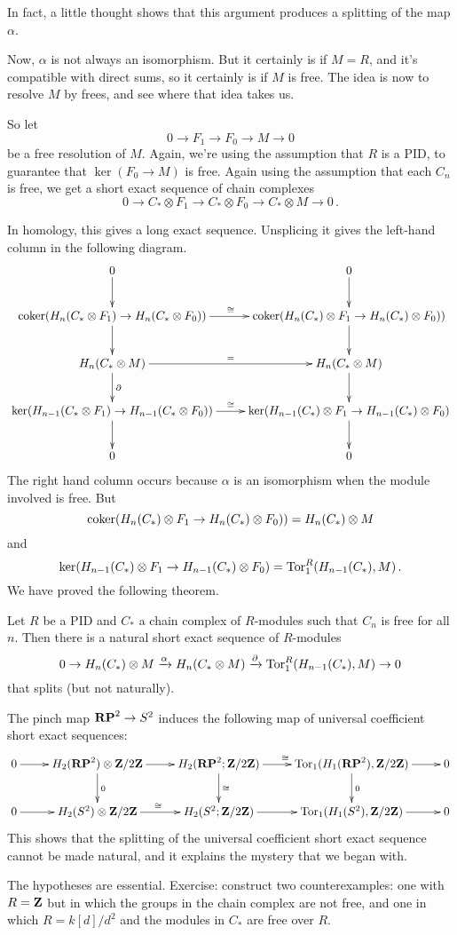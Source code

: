 In fact, a little thought shows that this argument produces a splitting of
the map $\alpha$. 

Now, $\alpha$ is not always an isomorphism. But it certainly is if $M=R$, 
and it's compatible with direct sums, so it certainly is if $M$ is free. 
The idea is now to resolve $M$ by frees, and see where that idea takes us.

So let 
\[
0\to F_1\to F_0\to M\to0
\]
be a free resolution of $M$. Again, we're using the assumption that $R$ is
a PID, to guarantee that $\ker(F_0\to M)$ is free. Again using the assumption
that each $C_n$ is free, we get a short exact sequence of chain complexes
\[
0\to C_*\otimes F_1\to C_*\otimes F_0\to C_*\otimes M\to0\,.
\]

In homology, this gives a long exact sequence. Unsplicing it gives the
left-hand column in the following diagram.
\begin{equation*}
\xymatrix{
0 \ar[d] & 0\ar[d] \\
\coker(H_n(C_\ast\otimes F_1)\to H_n(C_\ast\otimes F_0)) \ar[d] \ar[r]^\cong 
& \coker(H_n(C_\ast)\otimes F_1\to H_n(C_\ast)\otimes F_0)) \ar[d] \\
H_n(C_\ast\otimes M) \ar[d]^\partial \ar[r]^= & 
H_n(C_\ast\otimes M) \ar[d]\\
\ker( H_{n-1}(C_\ast\otimes F_1)\to H_{n-1}(C_\ast\otimes F_0))
\ar[r]^\cong\ar[d] & 
\ker(H_{n-1}(C_*)\otimes F_1\to H_{n-1}(C_*)\otimes F_0) \ar[d]\\
0 & 0}
\end{equation*}
The right hand column occurs because $\alpha$ is an isomorphism when the module
involved is free. But 
\[
\operatorname{coker}(H_n(C_\ast)\otimes F_1\to H_n(C_\ast)\otimes F_0))=H_n(C_*)\otimes M
\]
and
\[
\ker(H_{n-1}(C_\ast)\otimes F_1\to H_{n-1}(C_\ast)\otimes F_0)=
\operatorname{Tor}^R_1(H_{n-1}(C_\ast),M)\,.
\]
We have proved the following theorem.
\begin{theorem}
Let $R$ be a PID and $C_\ast$ a chain complex of $R$-modules such that $C_n$ 
is free for all $n$. Then there is a natural short 
exact sequence of $R$-modules
\begin{equation*}
0\to H_n(C_\ast)\otimes M\xrightarrow{\alpha} H_n(C_\ast\otimes M)\xrightarrow{\partial}\operatorname{Tor}^R_1( H_{n-1}(C_\ast),M)\to 0
\end{equation*}
that splits (but not naturally).
\end{theorem}
\begin{example}
The pinch map $\mathbf{RP}^2\to S^2$ induces the following map of universal
coefficient short exact sequences:
\[
\xymatrix{
0 \ar[r] & H_2(\RP^2)\otimes\Z/2\Z \ar[d]^0 \ar[r] & 
H_2(\RP^2;\Z/2\Z) \ar[d]^\cong \ar[r]^\cong & 
\Tor_1(H_1(\RP^2),\Z/2\Z) \ar[d]^0 \ar[r] & 0 \\
0 \ar[r] & H_2(S^2)\otimes\Z/2\Z \ar[r]^\cong & H_2(S^2;\Z/2\Z) \ar[r] &
\Tor_1(H_1(S^2),\Z/2\Z) \ar[r] & 0 
}\]
This shows that the splitting of the universal coefficient short exact 
sequence cannot be made natural, and it explains the mystery that we began 
with.
\end{example}
\begin{remark}
The hypotheses are essential. Exercise: construct two counterexamples:
one with $R=\mathbf Z$ but in which the groups in the chain complex are not free,
and one in which $R=k[d]/d^2$ and the modules in $C_*$ are free over $R$.  
\end{remark}

